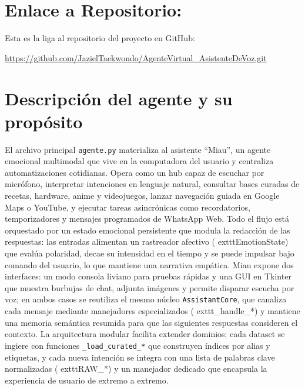 \documentclass[a4paper,12pt]{article}
\begin{document}
\section{Enlace a Repositorio:}
Esta es la liga al repositorio del proyecto en GitHub:

\url{https://github.com/JazielTaekwondo/AgenteVirtual_AsistenteDeVoz.git}

\section{Descripci\'on del agente y su prop\'osito}
El archivo principal \texttt{agente.py} materializa al asistente ``Miau'', un agente emocional multimodal que vive en la computadora del usuario y centraliza automatizaciones cotidianas. Opera como un hub capaz de escuchar por micr\'ofono, interpretar intenciones en lenguaje natural, consultar bases curadas de recetas, hardware, anime y videojuegos, lanzar navegaci\'on guiada en Google Maps o YouTube, y ejecutar tareas asincr\'onicas como recordatorios, temporizadores y mensajes programados de WhatsApp Web. Todo el flujo est\'a orquestado por un estado emocional persistente que modula la redacci\'on de las respuestas: las entradas alimentan un rastreador afectivo (	exttt{EmotionState}) que eval\'ua polaridad, decae su intensidad en el tiempo y se puede impulsar bajo comando del usuario, lo que mantiene una narrativa emp\'atica. Miau expone dos interfaces: un modo consola liviano para pruebas r\'apidas y una GUI en Tkinter que muestra burbujas de chat, adjunta im\'agenes y permite disparar escucha por voz; en ambos casos se reutiliza el mesmo n\'ucleo \texttt{AssistantCore}, que canaliza cada mensaje mediante manejadores especializados (	exttt{\_handle\_*}) y mantiene una memoria sem\'antica resumida para que las siguientes respuestas consideren el contexto. La arquitectura modular facilita extender dominios: cada dataset se ingiere con funciones \texttt{\_load\_curated\_*} que construyen \'indices por alias y etiquetas, y cada nueva intenci\'on se integra con una lista de palabras clave normalizadas (	exttt{RAW\_*}) y un manejador dedicado que encapsula la experiencia de usuario de extremo a extremo. 
\end{document}
